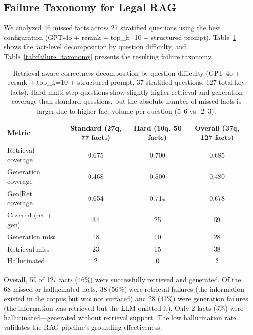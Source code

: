 \documentclass{article}
\begin{document}
\subsection{Failure Taxonomy for Legal RAG}
\label{sec:failure_taxonomy}

We analyzed 46 missed facts across 27 stratified questions using the best configuration (GPT-4o + rerank + top\_k=10 + structured prompt). Table~\ref{tab:fact_decomposition} shows the fact-level decomposition by question difficulty, and Table~\ref{tab:failure_taxonomy} presents the resulting failure taxonomy.

\begin{table}[t]
  \caption{Retrieval-aware correctness decomposition by question difficulty (GPT-4o + rerank + top\_k=10 + structured prompt, 37 stratified questions, 127 total key facts). Hard multi-step questions show slightly higher retrieval and generation coverage than standard questions, but the absolute number of missed facts is larger due to higher fact volume per question (5--6 vs.\ 2--3).}
  \label{tab:fact_decomposition}
  \centering
  \small
  \begin{tabular}{lccc}
    \toprule
    Metric & Standard (27q, 77 facts) & Hard (10q, 50 facts) & Overall (37q, 127 facts) \\
    \midrule
    Retrieval coverage & 0.675 & 0.700 & 0.685 \\
    Generation coverage & 0.468 & 0.500 & 0.480 \\
    Gen$|$Ret coverage & 0.654 & 0.714 & 0.678 \\
    \midrule
    Covered (ret + gen) & 34 & 25 & 59 \\
    Generation miss & 18 & 10 & 28 \\
    Retrieval miss & 23 & 15 & 38 \\
    Hallucinated & 2 & 0 & 2 \\
    \bottomrule
  \end{tabular}
\end{table}

Overall, 59 of 127 facts (46\%) were successfully retrieved and generated. Of the 68 missed or hallucinated facts, 38 (56\%) were retrieval failures (the information existed in the corpus but was not surfaced) and 28 (41\%) were generation failures (the information was retrieved but the LLM omitted it). Only 2 facts (3\%) were hallucinated---generated without retrieval support. The low hallucination rate validates the RAG pipeline's grounding effectiveness.
\end{document}
